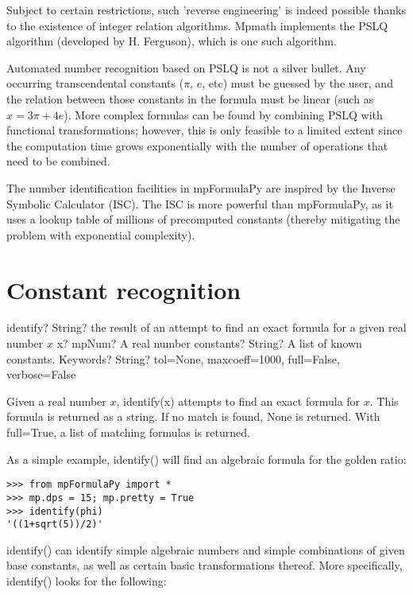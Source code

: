 Subject to certain restrictions, such 'reverse engineering' is indeed possible thanks to the existence of integer relation algorithms. Mpmath implements the PSLQ algorithm (developed by H. Ferguson), which is one such algorithm.

Automated number recognition based on PSLQ is not a silver bullet. Any occurring transcendental constants ($\pi$, $e$, etc) must be guessed by the user, and the relation between those constants in the formula must be linear (such as $x=3\pi+4e$). More complex formulas can be found by combining PSLQ with functional transformations; however, this is only feasible to a limited extent since the computation time grows exponentially with the number of operations that need to be combined.

The number identification facilities in mpFormulaPy are inspired by the Inverse Symbolic Calculator (ISC). The ISC is more powerful than mpFormulaPy, as it uses a lookup table of millions of precomputed constants (thereby mitigating the problem with exponential complexity).



\section{Constant recognition}




\begin{mpFunctionsExtract}
	\mpFunctionThree
	{identify? String? the result of an attempt to find an exact formula for a given real number $x$}
	{x? mpNum? A real number}
	{constants? String? A list of known constants.}	
	{Keywords? String?  tol=None, maxcoeff=1000, full=False, verbose=False}	
\end{mpFunctionsExtract}


\vpara
Given a real number $x$, identify(x) attempts to find an exact formula for $x$. This formula is returned as a string. If no match is found, None is returned. With full=True, a list of matching formulas is returned.

\vpara
As a simple example, identify() will find an algebraic formula for the golden ratio:


\begin{lstlisting}
>>> from mpFormulaPy import *
>>> mp.dps = 15; mp.pretty = True
>>> identify(phi)
'((1+sqrt(5))/2)'
\end{lstlisting}


identify() can identify simple algebraic numbers and simple combinations of given base constants, as well as certain basic transformations thereof. More specifically, identify() looks for the following:

